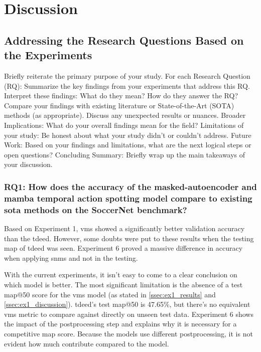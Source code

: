 \chapter{Discussion}
\label{chap:discussion}

\section{Addressing the Research Questions Based on the Experiments}

Briefly reiterate the primary purpose of your study.
For each Research Question (RQ):
Summarize the key findings from your experiments that address this RQ.
Interpret these findings: What do they mean? How do they answer the RQ?
Compare your findings with existing literature or State-of-the-Art (SOTA) methods (as appropriate).
Discuss any unexpected results or nuances.
Broader Implications: What do your overall findings mean for the field?
Limitations of your study: Be honest about what your study didn't or couldn't address.
Future Work: Based on your findings and limitations, what are the next logical steps or open questions?
Concluding Summary: Briefly wrap up the main takeaways of your discussion.



\subsection{RQ1: How does the accuracy of the masked-autoencoder and mamba temporal action spotting model compare to existing \acrlong{sota} methods on the SoccerNet benchmark?}


Based on Experiment 1, \acrshort{vms} showed a significantly better validation accuracy than the \acrshort{tdeed}. However, some doubts were put to these results when the testing \acrshort{map} of \acrshort{tdeed} was seen.
Experiment 6 proved a massive difference in accuracy when applying \acrfull{snms} and not in the testing. 


With the current experiments, it isn't easy to come to a clear conclusion on which model is better. The most significant limitation is the absence of a test \acrshort{map}@50 score for the \acrshort{vms} model (as stated in \cref{ssec:ex1_results} and \cref{ssec:ex1_discussion}). \acrshort{tdeed}'s test \acrshort{map}@50 is 47.65\%, but there's no equivalent \acrshort{vms} metric to compare against directly on unseen test data. Experiment 6 shows the impact of the postprocessing step and explains why it is necessary for a competitive \acrshort{map} score. Because the models use different postprocessing, it is not evident how much contribute compared to the model. 



